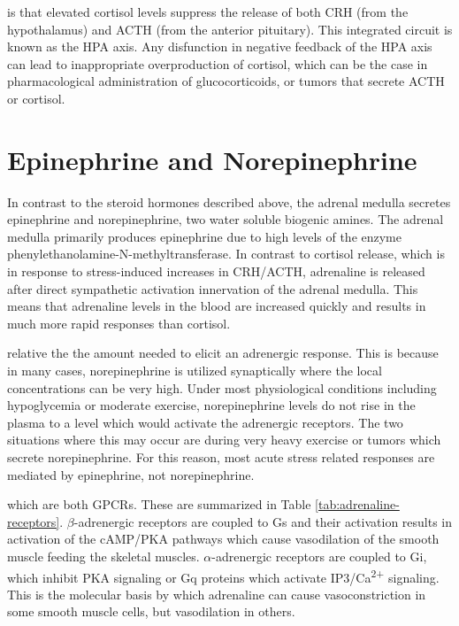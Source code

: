 \documentclass{tufte-handout}
\begin{document}
 is that elevated cortisol levels suppress the release of both CRH (from the hypothalamus) and ACTH (from the anterior pituitary).  This integrated circuit is known as the HPA axis.  Any disfunction in negative feedback of the HPA axis can lead to inappropriate overproduction of cortisol, which can be the case in pharmacological administration of glucocorticoids, or tumors that secrete ACTH or cortisol.

\section{Epinephrine and Norepinephrine}

In contrast to the steroid hormones described above, the adrenal medulla secretes epinephrine and norepinephrine, two water soluble biogenic amines.  The adrenal medulla primarily produces epinephrine due to high levels of the enzyme phenylethanolamine-N-methyltransferase.  In contrast to cortisol release, which is in response to stress-induced increases in CRH/ACTH, adrenaline is released after direct sympathetic activation innervation of the adrenal medulla.  This means that adrenaline levels in the blood are increased quickly and results in much more rapid responses than cortisol.  

 relative the the amount needed to elicit an adrenergic response.  This is because in many cases, norepinephrine is utilized synaptically where the local concentrations can be very high.  Under most physiological conditions including hypoglycemia or moderate exercise, norepinephrine levels do not rise in the plasma to a level which would activate the adrenergic receptors.  The two situations where this may occur are during very heavy exercise or tumors which secrete norepinephrine.  For this reason, most acute stress related responses are mediated by epinephrine, not norepinephrine.

 which are both GPCRs.  These are summarized in Table \ref{tab:adrenaline-receptors}.  $\beta$-adrenergic receptors are coupled to Gs and their activation results in activation of the cAMP/PKA pathways which cause vasodilation of the smooth muscle feeding the skeletal muscles.  $\alpha$-adrenergic receptors are coupled to Gi, which inhibit PKA signaling or Gq proteins which activate IP3/Ca\textsuperscript{2+} signaling.  This is the molecular basis by which adrenaline can cause vasoconstriction in some smooth muscle cells, but vasodilation in others.
\end{document}

